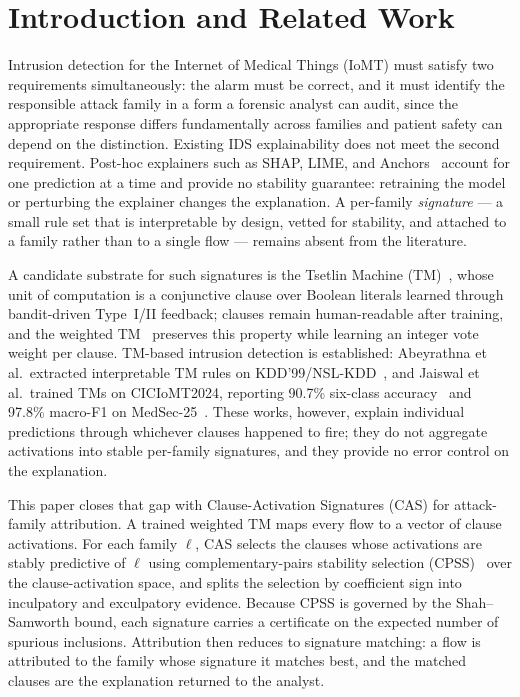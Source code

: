 \documentclass[conference]{IEEEtran}
\begin{document}
\section{Introduction and Related Work}
Intrusion detection for the Internet of Medical Things (IoMT) must satisfy
two requirements simultaneously: the alarm must be correct, and it must
identify the responsible attack family in a form a forensic analyst can
audit, since the appropriate response differs fundamentally across families
and patient safety can depend on the distinction. Existing IDS
explainability does not meet the second requirement. Post-hoc explainers
such as SHAP, LIME, and Anchors~\cite{xaiids2025} account for one
prediction at a time and provide no stability guarantee: retraining the
model or perturbing the explainer changes the explanation. A per-family
\emph{signature} --- a small rule set that is interpretable by design,
vetted for stability, and attached to a family rather than to a single
flow --- remains absent from the literature.

A candidate substrate for such signatures is the Tsetlin Machine
(TM)~\cite{granmo2018}, whose unit of computation is a conjunctive clause
over Boolean literals learned through bandit-driven Type~I/II feedback;
clauses remain human-readable after training, and the weighted
TM~\cite{phoulady2020} preserves this property while learning an integer
vote weight per clause. TM-based intrusion detection is established:
Abeyrathna et al.\ extracted interpretable TM rules on
KDD'99/NSL-KDD~\cite{abeyrathna2020}, and Jaiswal et al.\ trained TMs on
CICIoMT2024, reporting 90.7\% six-class accuracy~\cite{jaiswal2026iomt}
and 97.8\% macro-F1 on MedSec-25~\cite{jaiswal2026medsec}. These works,
however, explain individual predictions through whichever clauses happened
to fire; they do not aggregate activations into stable per-family
signatures, and they provide no error control on the explanation.

This paper closes that gap with Clause-Activation Signatures (CAS) for
attack-family attribution. A trained weighted TM maps every flow to a
vector of clause activations. For each family $\ell$, CAS selects the
clauses whose activations are stably predictive of $\ell$ using
complementary-pairs stability selection (CPSS)~\cite{shah2013} over the
clause-activation space, and splits the selection by coefficient sign into
inculpatory and exculpatory evidence. Because CPSS is governed by the
Shah--Samworth bound, each signature carries a certificate on the expected
number of spurious inclusions. Attribution then reduces to signature
matching: a flow is attributed to the family whose signature it matches
best, and the matched clauses are the explanation returned to the
analyst.
\end{document}
